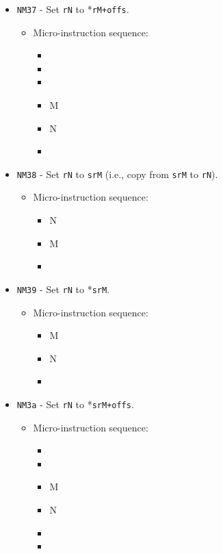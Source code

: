 \documentclass{article}
\begin{document}
\begin{itemize}
    \item \Verb|NM37| - Set \Verb|rN| to *\Verb|rM+offs|.
    \begin{itemize}
        \item Micro-instruction sequence:
        \begin{itemize}
            \item \pkptroutinc
            \item \datatooffs
            \item \incrementpk
            \item \regptodatao M
            \item \datatoreg N
            \item \done
        \end{itemize}
    \end{itemize}
    
    \item \Verb|NM38| - Set \Verb|rN| to \Verb|srM| (i.e., copy from \Verb|srM| to \Verb|rN|).
    \begin{itemize}
        \item Micro-instruction sequence:
        \begin{itemize}
            \item \specialtodata N
            \item \datatoreg M
            \item \done
        \end{itemize}
    \end{itemize}

    \item \Verb|NM39| - Set \Verb|rN| to *\Verb|srM|.
    \begin{itemize}
        \item Micro-instruction sequence:
        \begin{itemize}
            \item \specialptodata M
            \item \datatoreg N
            \item \done
        \end{itemize}
    \end{itemize}
    
    \item \Verb|NM3a| - Set \Verb|rN| to *\Verb|srM+offs|.
    \begin{itemize}
        \item Micro-instruction sequence:
        \begin{itemize}
            \item \pkptroutinc
            \item \datatooffs
            \item \specialptodatao M
            \item \datatoreg N
            \item \incrementpk
            \item \done
        \end{itemize}
    \end{itemize}


\end{itemize}
\end{document}
